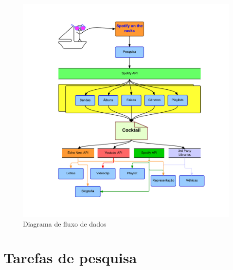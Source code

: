 \documentclass[twocolumn,twoside,11pt,a4paper]{article}
\begin{document}
\begin{figure}[hb]
    \centering
    \includegraphics[width=\textwidth]{flow}
    \caption{Diagrama de fluxo de dados}
    \label{fig:flow}
\end{figure}

\clearpage


\section{Tarefas de pesquisa}\label{sec:searches}
\end{document}
